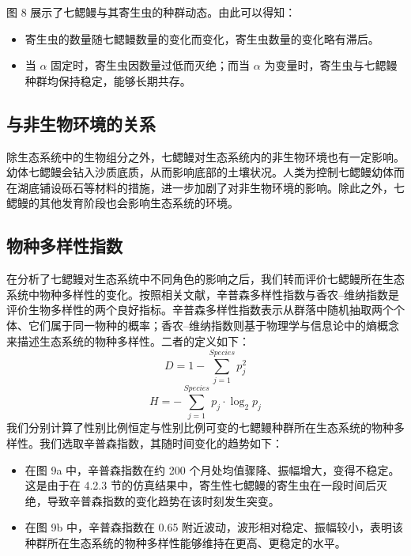 \documentclass[11pt,a4paper]{ctexart}
\begin{document}
图 8 展示了七鳃鳗与其寄生虫的种群动态。由此可以得知：

\begin{itemize}
\item 寄生虫的数量随七鳃鳗数量的变化而变化，寄生虫数量的变化略有滞后。
\item 当 $\alpha$ 固定时，寄生虫因数量过低而灭绝；而当 $\alpha$ 为变量时，寄生虫与七鳃鳗种群均保持稳定，能够长期共存。
\end{itemize}

\subsection{与非生物环境的关系}

除生态系统中的生物组分之外，七鳃鳗对生态系统内的非生物环境也有一定影响。幼体七鳃鳗会钻入沙质底质，从而影响底部的土壤状况。人类为控制七鳃鳗幼体而在湖底铺设砾石等材料的措施，进一步加剧了对非生物环境的影响。除此之外，七鳃鳗的其他发育阶段也会影响生态系统的环境。

\subsection{物种多样性指数}

在分析了七鳃鳗对生态系统中不同角色的影响之后，我们转而评价七鳃鳗所在生态系统中物种多样性的变化。按照相关文献，辛普森多样性指数与香农–维纳指数是评价生物多样性的两个良好指标。辛普森多样性指数表示从群落中随机抽取两个个体、它们属于同一物种的概率；香农–维纳指数则基于物理学与信息论中的熵概念来描述生态系统的物种多样性。二者的定义如下：
\begin{equation}
D=1-\sum_{j=1}^{Species}p_j^2 \tag{13}
\end{equation}
\begin{equation}
H=-\sum_{j=1}^{Species}p_j\cdot\log_2 p_j \tag{14}
\end{equation}
我们分别计算了性别比例恒定与性别比例可变的七鳃鳗种群所在生态系统的物种多样性。我们选取辛普森指数，其随时间变化的趋势如下：

\begin{itemize}
\item 在图 9a 中，辛普森指数在约 200 个月处均值骤降、振幅增大，变得不稳定。这是由于在 4.2.3 节的仿真结果中，寄生性七鳃鳗的寄生虫在一段时间后灭绝，导致辛普森指数的变化趋势在该时刻发生突变。
\item 在图 9b 中，辛普森指数在 0.65 附近波动，波形相对稳定、振幅较小，表明该种群所在生态系统的物种多样性能够维持在更高、更稳定的水平。
\end{itemize}
\end{document}
